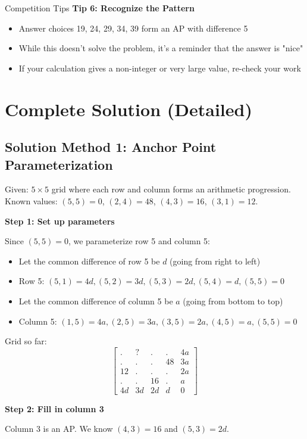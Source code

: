 \documentclass[12pt]{article}
\begin{document}
\begin{protipbox}{Competition Tips}
\textbf{Tip 6: Recognize the Pattern}
\begin{itemize}
    \item Answer choices 19, 24, 29, 34, 39 form an AP with difference 5
    \item While this doesn't solve the problem, it's a reminder that the answer is "nice"
    \item If your calculation gives a non-integer or very large value, re-check your work
\end{itemize}

\end{protipbox}

\section*{Complete Solution (Detailed)}

\subsection*{Solution Method 1: Anchor Point Parameterization}

Given: $5 \times 5$ grid where each row and column forms an arithmetic progression.
Known values: $(5,5) = 0$, $(2,4) = 48$, $(4,3) = 16$, $(3,1) = 12$.

\textbf{Step 1: Set up parameters}

Since $(5,5) = 0$, we parameterize row 5 and column 5:
\begin{itemize}
    \item Let the common difference of row 5 be $d$ (going from right to left)
    \item Row 5: $(5,1) = 4d, (5,2) = 3d, (5,3) = 2d, (5,4) = d, (5,5) = 0$
    \item Let the common difference of column 5 be $a$ (going from bottom to top)
    \item Column 5: $(1,5) = 4a, (2,5) = 3a, (3,5) = 2a, (4,5) = a, (5,5) = 0$
\end{itemize}

Grid so far:
\[\begin{bmatrix} . & ? &.&.&4a \\ .&.&.&48&3a\\ 12&.&.&.&2a\\ .&.&16&.&a\\ 4d&3d&2d&d&0\end{bmatrix}\]

\textbf{Step 2: Fill in column 3}

Column 3 is an AP. We know $(4,3) = 16$ and $(5,3) = 2d$.
\end{document}
